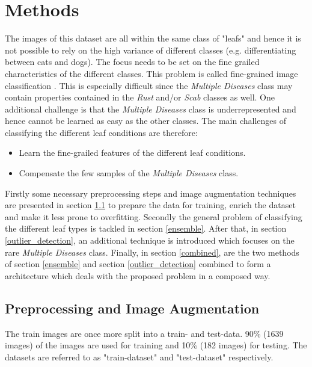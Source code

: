 \documentclass[10pt,twocolumn,letterpaper]{article}
\begin{document}
\section{Methods}
The images of this dataset are all within the same class of "leafs" and hence it is not possible to rely on the high variance of different classes (e.g. differentiating between cats and dogs). The focus needs to be set on the fine grailed characteristics of the different classes. This problem is called fine-grained image classification \cite{akata2015evaluation}. This is especially difficult since the \textit{Multiple Diseases} class may contain properties contained in the \textit{Rust} and/or \textit{Scab} classes as well. One additional challenge is that the \textit{Multiple Diseases}  class is underrepresented and hence cannot be learned as easy as the other classes.  The main challenges of classifying the different leaf conditions are therefore:
\begin{itemize}  
	\setlength\itemsep{0.1em} 
  	\item Learn the fine-grailed features of the different leaf conditions.
	\item Compensate the few samples of the \textit{Multiple Diseases}  class.
\end{itemize}
Firstly some necessary preprocessing steps and image augmentation techniques are presented in section \ref{augmentation} to prepare the data for training, enrich the dataset and make it less prone to overfitting. Secondly the general problem of classifying the different leaf types is tackled in section \ref{ensemble}. After that, in section \ref{outlier_detection}, an additional technique is introduced which focuses on the rare \textit{Multiple Diseases} class. Finally, in section \ref{combined}, are the two methods of section \ref{ensemble} and section \ref{outlier_detection} combined to form a architecture which deals with the proposed problem in a composed way.
\subsection{Preprocessing and Image Augmentation} \label{augmentation}
The train images are once more split into a train- and test-data. 90\% (1639 images) of the images are used for training and 10\% (182 images) for testing. The datasets are referred to as "train-dataset" and "test-dataset" respectively. 
\end{document}
